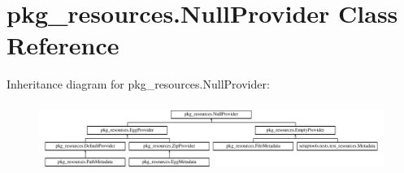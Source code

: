 \hypertarget{classpkg__resources_1_1NullProvider}{}\section{pkg\+\_\+resources.\+Null\+Provider Class Reference}
\label{classpkg__resources_1_1NullProvider}
Inheritance diagram for pkg\+\_\+resources.\+Null\+Provider\+:\begin{figure}[H]
\begin{center}
\leavevmode
\includegraphics[height=2.258065cm]{classpkg__resources_1_1NullProvider}
\end{center}
\end{figure}

